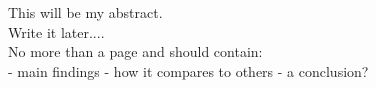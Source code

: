 This will be my abstract. \\
Write it later.... \\
No more than a page and should contain:\\
- main findings
- how it compares to others
- a conclusion?